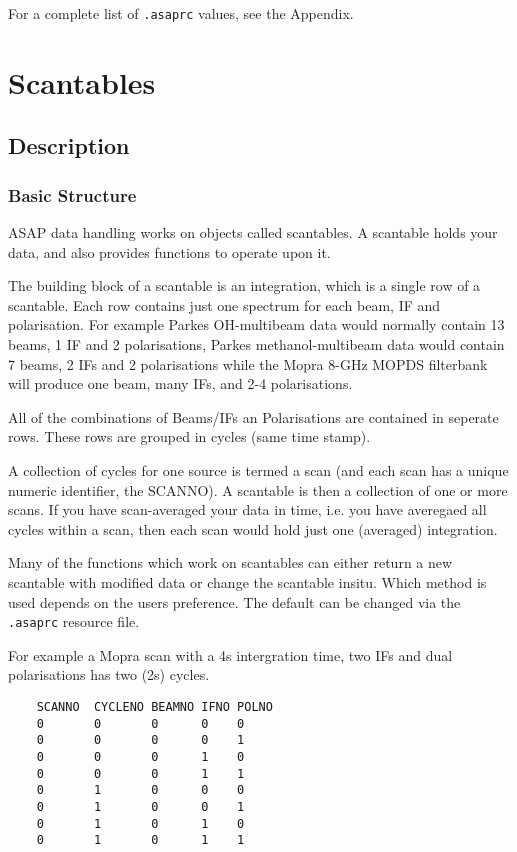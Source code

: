\documentclass[11pt]{article}
\newcommand{\cmd}[1]{{\tt #1}}
\begin{document}
For a complete list of \cmd{.asaprc} values, see the Appendix.

\section{Scantables}
\subsection {Description}

\subsubsection {Basic Structure}

ASAP data handling works on objects called
scantables.  A scantable holds your data, and also provides functions
to operate upon it.

The building block of a scantable is an integration, which is a single
row of a scantable. Each row contains just one spectrum for each beam,
IF and polarisation. For example Parkes OH-multibeam data would
normally contain 13 beams, 1 IF and 2 polarisations, Parkes
methanol-multibeam data would contain 7 beams, 2 IFs and 2
polarisations while the Mopra 8-GHz MOPDS filterbank will produce one
beam, many IFs, and 2-4 polarisations.

All of the combinations of Beams/IFs an Polarisations are
contained in seperate rows. These rows are grouped in cycles (same time stamp).

A collection of cycles for one source is termed a scan (and each scan
has a unique numeric identifier, the SCANNO). A scantable is then a
collection of one or more scans. If you have scan-averaged your data
in time, i.e. you have averegaed all cycles within a scan, then each
scan would hold just one (averaged) integration.

Many of the functions which work on scantables can either return a new
scantable with modified data or change the scantable insitu. Which
method is used depends on the users preference. The default can be
changed via the {\tt .asaprc} resource file.

For example a Mopra scan with a  4s intergration time, two IFs and
dual polarisations has two (2s) cycles.
\begin{verbatim}
    SCANNO  CYCLENO BEAMNO IFNO POLNO
    0       0       0      0    0
    0       0       0      0    1
    0       0       0      1    0
    0       0       0      1    1
    0       1       0      0    0
    0       1       0      0    1
    0       1       0      1    0
    0       1       0      1    1
\end{verbatim}
\end{document}
